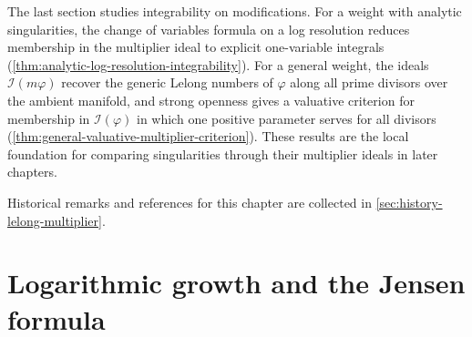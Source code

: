 The last section studies integrability on modifications. For a weight with analytic singularities, the change of variables formula on a log resolution reduces membership in the multiplier ideal to explicit one-variable integrals (\cref{thm:analytic-log-resolution-integrability}). For a general weight, the ideals $\mathcal I(m\varphi)$ recover the generic Lelong numbers of $\varphi$ along all prime divisors over the ambient manifold, and strong openness gives a valuative criterion for membership in $\mathcal I(\varphi)$ in which one positive parameter serves for all divisors (\cref{thm:general-valuative-multiplier-criterion}). These results are the local foundation for comparing singularities through their multiplier ideals in later chapters.

Historical remarks and references for this chapter are collected in \cref{sec:history-lelong-multiplier}.

\section{Logarithmic growth and the Jensen formula}
\label{sec:lelong-jensen}

